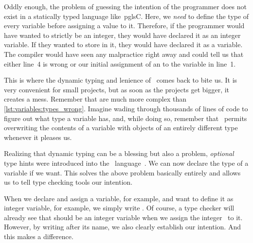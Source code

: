 Oddly enough, the problem of guessing the intention of the programmer does not exist in a statically typed language like~pgls{C}.
Here, we \emph{need} to define the type of every variable before assigning a value to it.
Therefore, if the programmer would have wanted  to strictly be an integer, they would have declared it as an integer variable.
If they wanted to store  in it, they would have declared it as a  variable.
The compiler would have seen any malpractice right away and could tell us that either line~4 is wrong or our initial assignment of an  to the variable in line~1.

This is where the dynamic typing and lenience of \python\ comes back to bite us.
It is very convenient for small projects, but as soon as the projects get bigger, it creates a mess.
Remember that  are much more complex than \cref{lst:variables:types_wrong}.
Imagine wading through thousands of lines of code to figure out what type a variable has, and, while doing so, remember that \python\ permits overwriting the contents of a variable with objects of an entirely different type whenever it pleases us.

Realizing that dynamic typing can be a blessing but also a problem, \emph{optional} type hints were introduced into the \python\ language~\cite{PEP484,R2023PTHATCPBNI}.
We can now declare the type of a variable if we want.
This solves the above problem basically entirely and allows us to tell type checking tools our intention.

When we declare and assign a variable,  for example, and want to define it as integer variable, for example, we simply write .
Of course, a type checker will already see that  should be an integer variable when we assign the integer~ to it.
However, by writing \pythonIdx{:} after its name, we also clearly establish our intention.
And this makes a difference.

%
%
%
%
%

